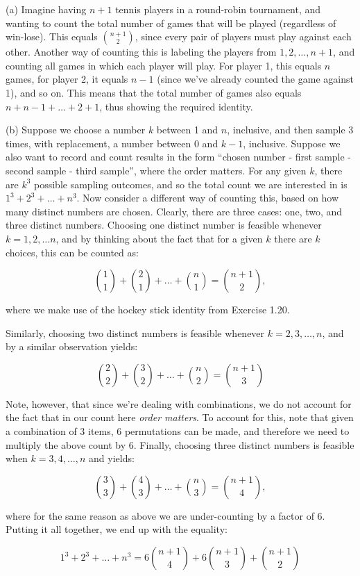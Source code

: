 \begin{solution}
    
    (a) Imagine having $n + 1$ tennis players in a round-robin tournament, and wanting to count the total number of games that will be played (regardless of win-lose).
    This equals $\binom{n + 1}{2}$, since every pair of players must play against each other.
    Another way of counting this is labeling the players from $1, 2, \ldots, n + 1$, and counting all games in which each player will play.
    For player 1, this equals $n$ games, for player 2, it equals $n - 1$ (since we've already counted the game against 1), and so on.
    This means that the total number of games also equals $n + n - 1 + \ldots + 2 + 1$, thus showing the required identity.

    (b) Suppose we choose a number $k$ between 1 and $n$, inclusive, and then sample 3 times, with replacement, a number between $0$ and $k - 1$, inclusive.
    Suppose we also want to record and count results in the form ``chosen number - first sample - second sample - third sample'', where the order matters.
    For any given $k$, there are $k^3$ possible sampling outcomes, and so the total count we are interested in is $1^3 + 2^3 + \ldots + n^3$.
    Now consider a different way of counting this, based on how many distinct numbers are chosen.
    Clearly, there are three cases: one, two, and three distinct numbers.
    Choosing one distinct number is feasible whenever $k = 1, 2, \ldots n$, and by thinking about the fact that for a given $k$ there are $k$ choices, this can be counted as:

    \[\binom{1}{1} + \binom{2}{1} + \ldots + \binom{n}{1} = \binom{n + 1}{2},\]

    where we make use of the hockey stick identity from Exercise 1.20.

    Similarly, choosing two distinct numbers is feasible whenever $k = 2, 3, \ldots, n$, and by a similar observation yields:

    \[\binom{2}{2} + \binom{3}{2} + \ldots + \binom{n}{2} = \binom{n + 1}{3}\]

    Note, however, that since we're dealing with combinations, we do not account for the fact that in our count here \textit{order matters}.
    To account for this, note that given a combination of 3 items, 6 permutations can be made, and therefore we need to multiply the above count by 6.
    Finally, choosing three distinct numbers is feasible when $k = 3, 4, \ldots, n$ and yields:

    \[\binom{3}{3} + \binom{4}{3} + \ldots + \binom{n}{3} = \binom{n + 1}{4},\]

    where for the same reason as above we are under-counting by a factor of 6.
    Putting it all together, we end up with the equality:

    \[1^3 + 2^3 + \ldots + n^3 = 6\binom{n + 1}{4} + 6\binom{n + 1}{3} + \binom{n + 1}{2}\]

\end{solution}

